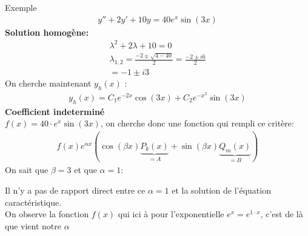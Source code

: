     \begin{parag}{Exemple}
        \begin{align*}
            y'' + 2y' + 10y = 40 e^{x}\sin(3x)
        \end{align*}
        \textbf{Solution homogène:}
        \\
        \begin{align*}
            \lambda^2 + 2 \lambda + 10 = 0\\
            \lambda_{1, 2} = \frac{-2 \pm \sqrt{4 - 40}}{2} = \frac{-2 \pm i6}{2}\\
            = -1 \pm i3
        \end{align*}
        On cherche maintenant $y_h(x)$ :
        \begin{align*}
            y_h(x) = C_1 e^{-2x} \cos(3x) + C_2e^{-x^2}\sin(3x)
        \end{align*}
        \textbf{Coefficient indeterminé}
        \\
        $f(x) = 40 \cdot e^x \sin(3x)$, on cherche donc une fonction qui rempli ce critère:
        \begin{align*}
           f(x)e^{ \alpha x}(\cos( \beta x) \underbrace{P_k(x)}_{=A} + \sin( \beta x) \underbrace{Q_m(x)}_{=B})
        \end{align*}
        On sait que $ \beta = 3$ et que $ \alpha = 1$:
        \begin{framedremark}
           Il n'y a pas de rapport direct entre ce $ \alpha  =1$ et la solution de l'équation caractéristique.
           \\
           On observe la fonction $f(x)$ qui ici à pour l'exponentielle $e^x = e^{ 1 \cdot x}$, c'est de là que vient notre $ \alpha$
        \end{framedremark}
        

\end{parag}
